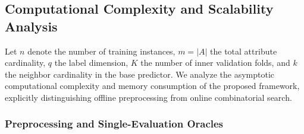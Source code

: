 \subsection{Computational Complexity and Scalability Analysis}
\label{subsec:complexity}
Let $n$ denote the number of training instances, $m = |A|$ the total attribute cardinality, $q$ the label dimension, $K$ the number of inner validation folds, and $k$ the neighbor cardinality in the base predictor. We analyze the asymptotic computational complexity and memory consumption of the proposed framework, explicitly distinguishing offline preprocessing from online combinatorial search.

\subsubsection{Preprocessing and Single-Evaluation Oracles}
